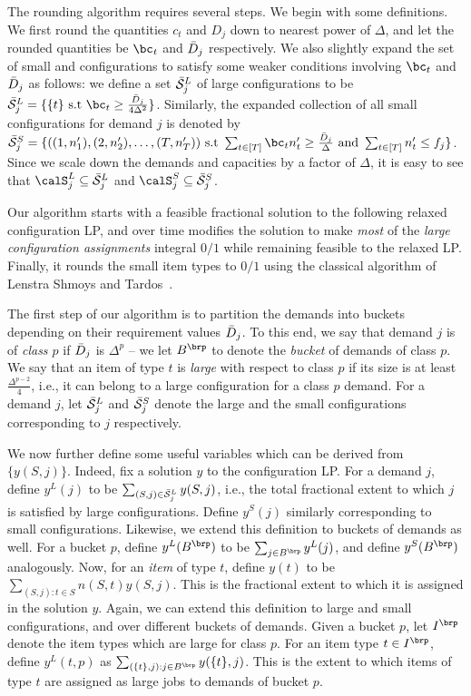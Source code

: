 The rounding algorithm requires several steps. We begin with some definitions.
We first round the quantities $c_t$ and $D_j$ down to nearest power of $\Delta$, and let the rounded quantities be $\bc_t$ and ${\bar D}_j$ respectively. 
We also slightly expand the set of small and configurations to satisfy some weaker conditions involving $\bc_t$ and ${\bar D}_j$ as follows: we define a set $\bar{\cal S}^L_j$ of large configurations to be $\barcalS^L_j = \{ \{t\} \text{ s.t } \bc_t \geq \frac{\barD_j}{4 \Delta^2}  \}$. Similarly, the expanded collection of all small configurations for demand $j$ is denoted by $\barcalS^S_j = \{ ((1,n'_1), (2,n'_2), \ldots, (T,n'_T)) \text{ s.t } \sum_{t \in [T]} \bc_t n'_t \geq \frac{\barD_j}{\Delta} \text{ and } \sum_{t \in [T]} n'_t \leq f_j \}$. Since we scale down the demands and capacities by a factor of $\Delta$, it is easy to see that $\calS^L_j \subseteq \barcalS^L_j$ and $\calS^S_j \subseteq \barcalS^S_j$.


Our algorithm starts with a feasible fractional solution to the following relaxed configuration LP, and over time modifies the solution to make \emph{most} of the \emph{large configuration assignments} integral $0/1$ while remaining feasible to the relaxed LP. Finally, it rounds the small item types to $0/1$ using the classical algorithm of Lenstra Shmoys and Tardos~\cite{LST}. 

\medskip {}
The first step of our algorithm is to partition the demands into buckets depending on their requirement values ${\bar D}_j$. To this end, we say that demand $j$ is of \emph{class $p$} if
${\bar D}_j$ is $\Delta^p$ -- we let $B^\brp$ to denote the \emph{bucket} of demands of class $p$. We say that an item of type $t$ is \emph{large} with respect to class $p$ if its size is at least $\frac{\Delta^{p-2}}{4}$, i.e., it can belong to a large configuration for a class $p$ demand.  For a demand $j$, let $\bar{\cal S}^L_j$ and $\bar{\cal S}^S_j$ denote the large and the small configurations corresponding to $j$ respectively.

We now further define some useful variables which can be derived from $\{y(S,j)\}$. Indeed, fix a solution $y$ to the configuration LP. For a demand $j$, define $y^L(j)$ to be $\sum_{(S,j) \in \bar{\cal S}^L_j} y(S,j)$, i.e., the total fractional extent to which $j$ is satisfied by large configurations. Define $y^S(j)$ similarly corresponding to small configurations. Likewise, we extend this definition to buckets of demands as well. For a bucket $p$, define $y^L(B^\brp)$ to be $\sum_{j \in B^\brp} y^L(j)$, and define $y^S(B^\brp)$ analogously. Now, for an \emph{item} of type $t$, define $y(t)$ to be $\sum_{(S,j) : t \in S} n(S,t) y(S,j)$. This is the fractional extent to which it is assigned in the solution $y$. Again, we can extend this definition to large and small configurations, and over different buckets of demands. Given a bucket $p$, let $I^\brp$ denote the item types which are large for class $p$. For an item type $t \in I^\brp$, define $y^L(t,p)$ as $\sum_{(\{t\}, j): j \in B^\brp} y(\{t\}, j)$. This is the extent to which items of type $t$ are assigned as large jobs to demands of bucket $p$.

